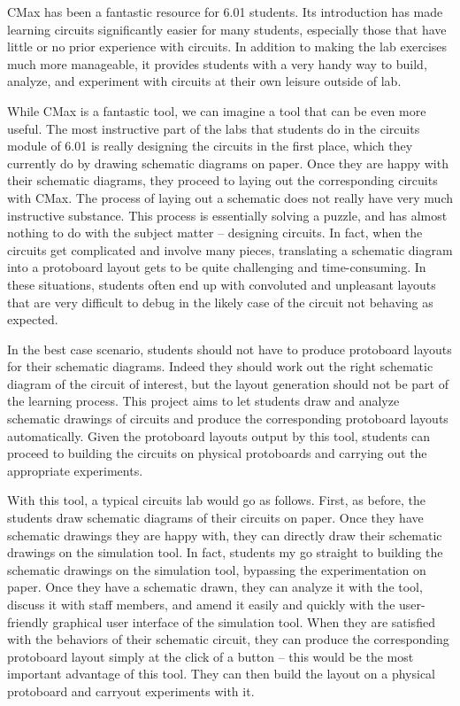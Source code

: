 CMax has been a fantastic resource for 6.01 students. Its introduction has made
learning circuits significantly easier for many students, especially those that
have little or no prior experience with circuits. In addition to making the lab
exercises much more manageable, it provides students with a very handy way to
build, analyze, and experiment with circuits at their own leisure outside of lab.

While CMax is a fantastic tool, we can imagine a tool that can be even more
useful. The most instructive part of the labs that students do in the circuits
module of 6.01 is really designing the circuits in the first place, which they
currently do by drawing schematic diagrams on paper. Once they are happy with
their schematic diagrams, they proceed to laying out the corresponding circuits
with CMax. The process of laying out a schematic does not really have very much
instructive substance. This process is essentially solving a puzzle, and has
almost nothing to do with the subject matter -- designing circuits. In fact,
when the circuits get complicated and involve many pieces, translating a
schematic diagram into a protoboard layout gets to be quite challenging and
time-consuming. In these situations, students often end up with convoluted and
unpleasant layouts that are very difficult to debug in the likely case of the
circuit not behaving as expected.

In the best case scenario, students should not have to produce protoboard
layouts for their schematic diagrams. Indeed they should work out the right
schematic diagram of the circuit of interest, but the layout generation should
not be part of the learning process. This project aims to let students draw and
analyze schematic drawings of circuits and produce the corresponding protoboard
layouts automatically. Given the protoboard layouts output by this tool,
students can proceed to building the circuits on physical protoboards and
carrying out the appropriate experiments.

With this tool, a typical circuits lab would go as follows. First, as before,
the students draw schematic diagrams of their circuits on paper. Once they have
schematic drawings they are happy with, they can directly draw their schematic
drawings on the simulation tool. In fact, students my go straight to building
the schematic drawings on the simulation tool, bypassing the experimentation on
paper. Once they have a schematic drawn, they can analyze it with the tool,
discuss it with staff members, and amend it easily and quickly with the
user-friendly graphical user interface of the simulation tool. When they are
satisfied with the behaviors of their schematic circuit, they can produce the
corresponding protoboard layout simply at the click of a button -- this would be
the most important advantage of this tool. They can then build the layout on a
physical protoboard and carryout experiments with it.

